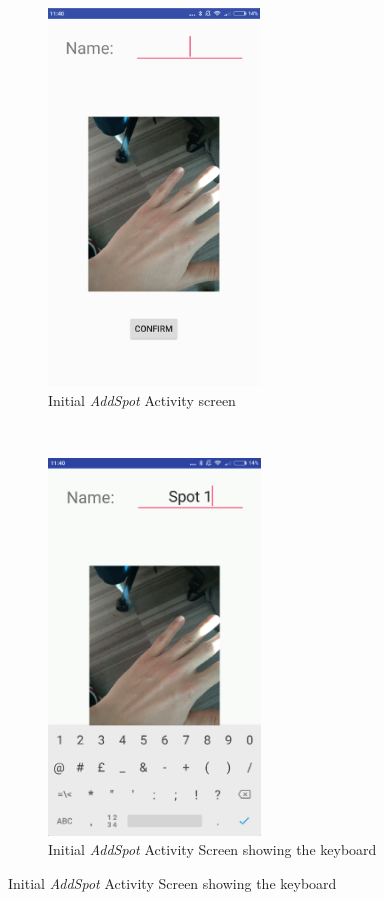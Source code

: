 \begin{figure}[t!]
    \centering
    \begin{subfigure}[t]{0.5\textwidth}
        \centering
        \includegraphics[height=10cm]{figures/addspot1.png}
        \caption{Initial \emph{AddSpot} Activity screen}
        \label{subfig:oldaddspot}
    \end{subfigure}%
        ~
    \begin{subfigure}[t]{0.5\textwidth}
        \centering
        \includegraphics[height=10cm]{figures/oldaddspotkeyboard.png}
        \caption{Initial \emph{AddSpot} Activity Screen showing the keyboard}
        \label{subfig:oldaddspotkeyboard}
    \end{subfigure}

\end{figure}
